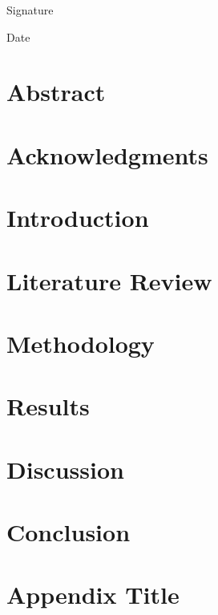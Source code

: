 \documentclass[12pt,a4paper]{report}
\begin{document}
\vspace{2cm}
\noindent\makebox[2.5in]{\hrulefill}

\noindent Signature

\vspace{0.5cm}
\noindent\makebox[2.5in]{\hrulefill}

\noindent Date

\clearpage

\chapter*{Abstract}

\clearpage

\chapter*{Acknowledgments}

\clearpage

\tableofcontents
\clearpage
\listoffigures
\clearpage
\listoftables
\clearpage

\chapter{Introduction}

\chapter{Literature Review}

\chapter{Methodology}

\chapter{Results}

\chapter{Discussion}

\chapter{Conclusion}




\appendix
\chapter{Appendix Title}
\end{document}
